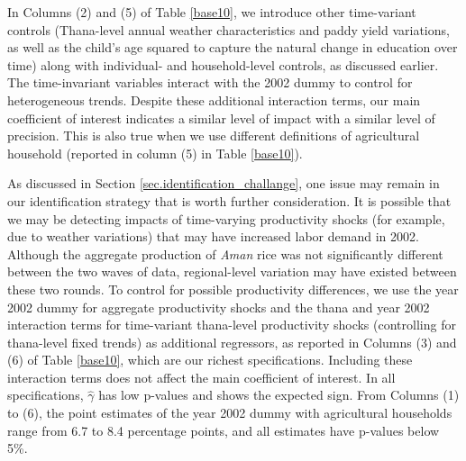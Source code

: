 \documentclass[12pt,letterpaper]{article}
\newcommand{\0}{\ensuremath{\mbox{\boldmath $0$}}}
\begin{document}
In Columns (2) and (5) of Table \ref{base10}, we introduce other time-variant controls (Thana-level annual weather characteristics and paddy yield variations, as well as the child's age squared to capture the natural change in education over time) along with individual- and household-level controls, as discussed earlier. The time-invariant variables interact with the 2002 dummy to control for heterogeneous trends. Despite these additional interaction terms, our main coefficient of interest indicates a similar level of impact with a similar level of precision. This is also true when we use different definitions of agricultural household (reported in column (5) in Table \ref{base10}).

As discussed in Section \ref{sec.identification_challange}, one issue may remain in our identification strategy that is worth further consideration. It is possible that we may be detecting impacts of time-varying productivity shocks (for example, due to weather variations) that may have increased labor demand in 2002. Although the aggregate production of \textit{Aman} rice was not significantly different between the two waves of data, regional-level variation may have existed between these two rounds. To control for possible productivity differences, we use the year 2002 dummy for aggregate productivity shocks and the thana and year 2002 interaction terms for time-variant thana-level productivity shocks (controlling for thana-level fixed trends) as additional regressors, as reported in Columns (3) and (6) of Table \ref{base10}, which are our richest specifications. Including these interaction terms does not affect the main coefficient of interest. In all specifications, $\hat{\gamma}$ has low p-values and shows the expected sign. From Columns (1) to (6), the point estimates of the year 2002 dummy with agricultural households range from 6.7 to 8.4 percentage points, and all estimates have p-values below 5\%. 
\end{document}
